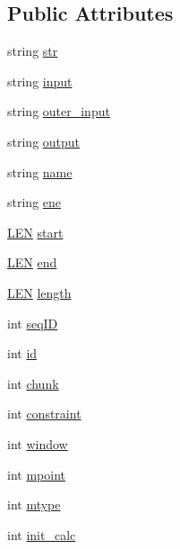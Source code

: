 \subsection*{Public Attributes}
\begin{DoxyCompactItemize}
\item 
string \hyperlink{class_rfold_1_1_arg_a10258eb45eb764844e49e5587e187af7}{str}
\item 
string \hyperlink{class_rfold_1_1_arg_a9844cbade756ff05f5c9592f17a63d95}{input}
\item 
string \hyperlink{class_rfold_1_1_arg_ae62e02353945f6073c46c27c7f583649}{outer\+\_\+input}
\item 
string \hyperlink{class_rfold_1_1_arg_a172c943d9eafc1bfc27fde48db831f5d}{output}
\item 
string \hyperlink{class_rfold_1_1_arg_a38ab74cced49339e67fe8f70bb6827fb}{name}
\item 
string \hyperlink{class_rfold_1_1_arg_a3fc1f86f5f3f7b2572392b547a2ef6a9}{ene}
\item 
\hyperlink{energy__const_8hh_a05b49c662c073f89e86804f7856622a0}{L\+E\+N} \hyperlink{class_rfold_1_1_arg_afe6c58f953e12b4964a7c14b78ee731e}{start}
\item 
\hyperlink{energy__const_8hh_a05b49c662c073f89e86804f7856622a0}{L\+E\+N} \hyperlink{class_rfold_1_1_arg_ad5641c6dff38e98a3dadb60223a4b630}{end}
\item 
\hyperlink{energy__const_8hh_a05b49c662c073f89e86804f7856622a0}{L\+E\+N} \hyperlink{class_rfold_1_1_arg_ae5c8053e399657b0c83bd10a904ac354}{length}
\item 
int \hyperlink{class_rfold_1_1_arg_a7e5e99f9fa61d2b7fe2d03d212f075d3}{seq\+I\+D}
\item 
int \hyperlink{class_rfold_1_1_arg_a49ec979ca116afb70aa7a25bff04d3a8}{id}
\item 
int \hyperlink{class_rfold_1_1_arg_a08a4793c210b819471f4541cc24f8859}{chunk}
\item 
int \hyperlink{class_rfold_1_1_arg_ab05512b7f96ce930ac13b873e7c298b1}{constraint}
\item 
int \hyperlink{class_rfold_1_1_arg_abf6954c2deff613f191b1fae248389f3}{window}
\item 
int \hyperlink{class_rfold_1_1_arg_a273269902f8a9b9974c1d46800df16e9}{mpoint}
\item 
int \hyperlink{class_rfold_1_1_arg_a9736867f9aac222c47efa0b5218fc8fa}{mtype}
\item 
int \hyperlink{class_rfold_1_1_arg_af97e7ba185a8a01a2d6baa5a1689f077}{init\+\_\+calc}

\end{DoxyCompactItemize}
